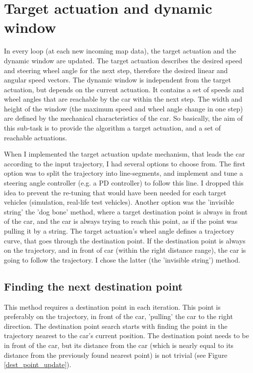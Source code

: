 \section{Target actuation and dynamic window}
\label{chap:target_actuation_and_dynamic_window}
In every loop (at each new incoming map data), the target actuation and the dynamic window are updated. The target actuation describes the desired speed and steering wheel angle for the next step, therefore the desired linear and angular speed vectors. The dynamic window is independent from the target actuation, but depends on the current actuation. It contains a set of speeds and wheel angles that are reachable by the car within the next step. The width and height of the window (the maximum speed and wheel angle change in one step) are defined by the mechanical characteristics of the car. So basically, the aim of this sub-task is to provide the algorithm a target actuation, and a set of reachable actuations.

When I implemented the target actuation update mechanism, that leads the car according to the input trajectory, I had several options to choose from. The first option was to split the trajectory into line-segments, and implement and tune a steering angle controller (e.g. a PD controller) to follow this line. I dropped this idea to prevent the re-tuning that would have been needed for each target vehicles (simulation, real-life test vehicles). Another option was the 'invisible string' the 'dog bone' method, where a target destination point is always in front of the car, and the car is always trying to reach this point, as if the point was pulling it by a string. The target actuation's wheel angle defines a trajectory curve, that goes through the destination point. If the destination point is always on the trajectory, and in front of car (within the right distance range), the car is going to follow the trajectory. I chose the latter (the 'invisible string') method.

\subsection{Finding the next destination point}
This method requires a destination point in each iteration. This point is preferably on the trajectory, in front of the car, 'pulling' the car to the right direction. The destination point search starts with finding the point in the trajectory nearest to the car's current position. The destination point needs to be in front of the car, but its distance from the car (which is nearly equal to its distance from the previously found nearest point) is not trivial (see Figure \ref{dest_point_update}).

